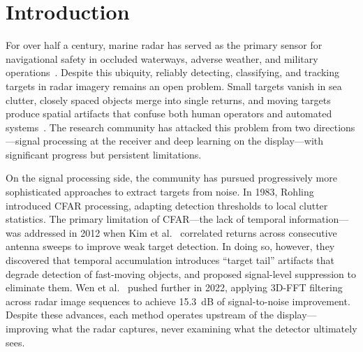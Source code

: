 \documentclass[twocolumn, 10pt]{article}
\begin{document}
\section{Introduction}

For over half a century, marine radar has served as the primary sensor for navigational safety in occluded waterways, adverse weather, and military operations~\cite{Skolnik2001Radar}. Despite this ubiquity, reliably detecting, classifying, and tracking targets in radar imagery remains an open problem. Small targets vanish in sea clutter, closely spaced objects merge into single returns, and moving targets produce spatial artifacts that confuse both human operators and automated systems~\cite{Ward2013Marine, Chen2022VisibilityGraph}. The research community has attacked this problem from two directions---signal processing at the receiver and deep learning on the display---with significant progress but persistent limitations.

On the signal processing side, the community has pursued progressively more sophisticated approaches to extract targets from noise. In 1983, Rohling~\cite{Rohling1983CFAR} introduced CFAR processing, adapting detection thresholds to local clutter statistics. The primary limitation of CFAR---the lack of temporal information---was addressed in 2012 when Kim et al.~\cite{Kim2012ScanCorrelation} correlated returns across consecutive antenna sweeps to improve weak target detection. In doing so, however, they discovered that temporal accumulation introduces ``target tail'' artifacts that degrade detection of fast-moving objects, and proposed signal-level suppression to eliminate them. Wen et al.~\cite{Wen2022SpatioTemporal} pushed further in 2022, applying 3D-FFT filtering across radar image sequences to achieve 15.3~dB of signal-to-noise improvement. Despite these advances, each method operates upstream of the display---improving what the radar captures, never examining what the detector ultimately sees.
\end{document}

